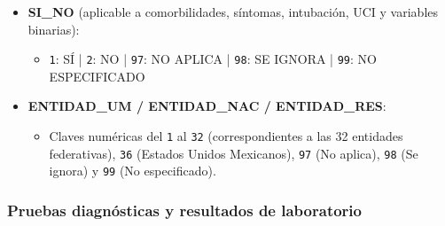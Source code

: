 \begin{itemize}
    \item \textbf{SI\_NO} (aplicable a comorbilidades, síntomas, intubación, UCI y variables binarias):
        \begin{itemize}
            \item \texttt{1}: SÍ | \texttt{2}: NO | \texttt{97}: NO APLICA | \texttt{98}: SE IGNORA | \texttt{99}: NO ESPECIFICADO
        \end{itemize}

    \item \textbf{ENTIDAD\_UM / ENTIDAD\_NAC / ENTIDAD\_RES}:
        \begin{itemize}
            \item Claves numéricas del \texttt{1} al \texttt{32} (correspondientes a las 32 entidades federativas), \texttt{36} (Estados Unidos Mexicanos), \texttt{97} (No aplica), \texttt{98} (Se ignora) y \texttt{99} (No especificado).
        \end{itemize}
\end{itemize}

\subsubsection{Pruebas diagnósticas y resultados de laboratorio}

